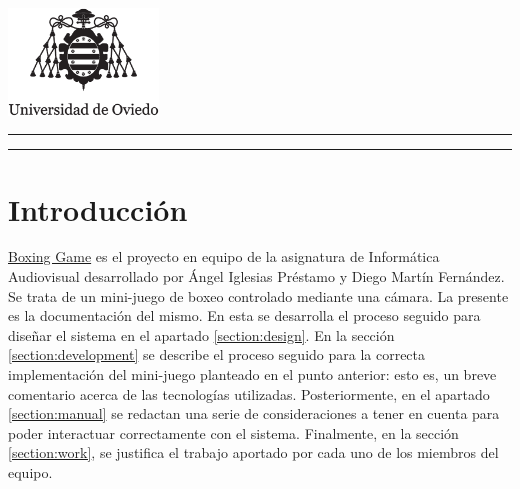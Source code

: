 \documentclass{article}
\begin{document}
\newcommand{\HRule}{\rule{\linewidth}{0.5mm}}
\begin{titlepage}
    \centering
    \includegraphics[width=0.3\textwidth]{img/uniovi.eps}
    \vfill
    \HRule
    \vspace{0.4cm}
    {\huge\bfseries\titulo\par}
    \vspace{1.5cm}
    {\Large\itshape\autorAngel\par\vspace{0.1cm}\autorDiego\par}
    \vspace{0.4cm}
    \HRule
    \vspace{1.5cm}
    {\LARGE\escuela\par}
    \vspace{0.5cm}
    {\Large\asignatura\par}
    \vfill
    {\large\universidad\par}
    \fecha
    \vfill
\end{titlepage}

\renewcommand{\contentsname}{Tabla de contenidos}
\tableofcontents{}
\newpage


\section{Introducción}

\href{https://angelip2303.github.io/boxing-docs/}{Boxing Game} es el proyecto en equipo de la asignatura de Informática Audiovisual desarrollado por Ángel Iglesias Préstamo y Diego Martín Fernández. Se trata de un mini-juego de boxeo controlado mediante una cámara. La presente es la documentación del mismo. En esta se desarrolla el proceso seguido para diseñar el sistema en el apartado \ref{section:design}. En la sección \ref{section:development} se describe el proceso seguido para la correcta implementación del mini-juego planteado en el punto anterior: esto es, un breve comentario acerca de las tecnologías utilizadas. Posteriormente, en el apartado \ref{section:manual} se redactan una serie de consideraciones a tener en cuenta para poder interactuar correctamente con el sistema. Finalmente, en la sección \ref{section:work}, se justifica el trabajo aportado por cada uno de los miembros del equipo.
\end{document}
